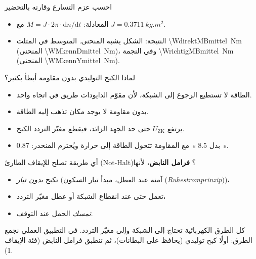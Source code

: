 \documentclass[11pt,a4paper]{article}
\newcommand{\de}[1]{(\textgerman{\itshape #1})}
\newcommand{\dt}[1]{\textgerman{#1}}
\begin{document}
\begin{frage}{احسب عزم التسارع وقارنه بالتحضير}
\begin{itemize}
\item المعادلة: $M = J\cdot2\pi\cdot\mathrm dn/\mathrm dt$ مع $J = \SI{0,3711}{kg.m^2}$.
\item النتيجة: الشكل يشبه المنحنى. المتوسط في المثلث \SI{\WdirektMBmittel}{Nm}
      (المنحنى \SI{\WMkennDmittel}{Nm})، وفي النجمة \SI{\WrichtigMBmittel}{Nm}
      (المنحنى \SI{\WMkennYmittel}{Nm}).
\end{itemize}
\end{frage}

\begin{frage}{لماذا الكبح التوليدي بدون مقاومة أبطأ بكثير؟}
\begin{itemize}
\item الطاقة لا تستطيع الرجوع إلى الشبكة، لأن مقوّم الدايودات طريق في اتجاه واحد.
\item بدون مقاومة لا يوجد مكان تذهب إليه الطاقة.
\item يرتفع $U_\mathrm{ZK}$ حتى حد الجهد الزائد، فيقطع مغيّر التردد الكبح.
\item مع المقاومة تتحول الطاقة إلى حرارة ويُحترم المنحدر: \SI{0,87}{s} بدل \SI{8,5}{s}.
\end{itemize}
\end{frage}

\begin{frage}{أي طريقة تصلح للإيقاف الطارئ \dt{(Not-Halt)}؟}
\textbf{فرامل النابض}، لأنها
\begin{itemize}
\item تكبح \emph{بدون تيار} (آمنة عند العطل، مبدأ تيار السكون \de{Ruhestromprinzip})،
\item تعمل حتى عند انقطاع الشبكة أو عطل مغيّر التردد،
\item \emph{تمسك} الحمل عند التوقف.
\end{itemize}
كل الطرق الكهربائية تحتاج إلى الشبكة وإلى مغيّر التردد. في التطبيق العملي نجمع الطرق:
أولًا كبح توليدي (يحافظ على البطانات)، ثم تنطبق فرامل النابض (فئة الإيقاف 1).
\end{frage}

\end{document}
